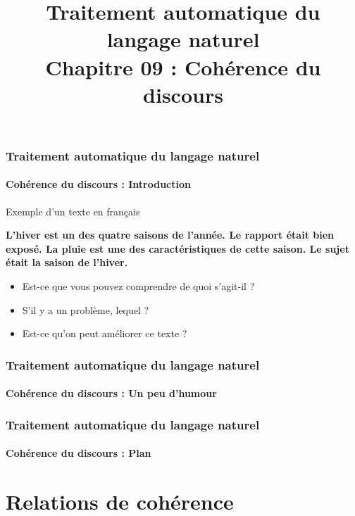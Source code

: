\documentclass[xcolor=table]{beamer}
\title[TALN : 09- Cohérence du discours]%
{Traitement automatique du langage naturel\\Chapitre 09 : Cohérence du discours}
\begin{document}
	
\begin{frame}
\frametitle{Traitement automatique du langage naturel}
\framesubtitle{Cohérence du discours : Introduction}

\begin{exampleblock}{Exemple d'un texte en français}
	\begin{center}
		\Large\bfseries
		L'hiver est un des quatre saisons de l'année. 
		Le rapport était bien exposé. 
		La pluie est une des caractéristiques de cette saison.
		Le sujet était la saison de l'hiver.
	\end{center}
\end{exampleblock}

\begin{itemize}
	\item Est-ce que vous pouvez comprendre de quoi s'agit-il ?
	\item S'il y a un problème, lequel ?
	\item Est-ce qu'on peut améliorer ce texte ?
\end{itemize}

\end{frame}

\begin{frame}
\frametitle{Traitement automatique du langage naturel}
\framesubtitle{Cohérence du discours :  Un peu d'humour}

\begin{center}
\end{center}

\end{frame}

\begin{frame}
\frametitle{Traitement automatique du langage naturel}
\framesubtitle{Cohérence du discours : Plan}

\begin{multicols}{2}
\tableofcontents
\end{multicols}
\end{frame}

\section{Relations de cohérence}
\end{document}
